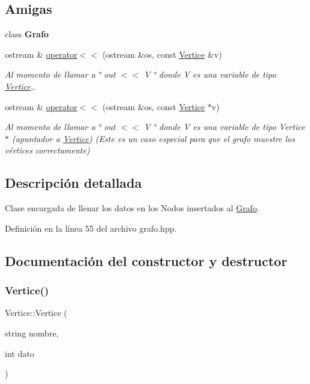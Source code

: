 \subsection*{Amigas}
\begin{DoxyCompactItemize}
\item 
\mbox{\label{classVertice_aa89bd7919924d99b99ffa9ab271175a3}} 
class {\bfseries Grafo}
\item 
ostream \& \hyperlink{classVertice_a3c70523eb9e12f80bb42762ac4708819}{operator$<$$<$} (ostream \&os, const \hyperlink{classVertice}{Vertice} \&v)
\begin{DoxyCompactList}\small\item\em Al momento de llamar a \char`\"{} out $<$$<$ V \char`\"{} donde V es una variable de tipo \hyperlink{classVertice}{Vertice},. \end{DoxyCompactList}\item 
ostream \& \hyperlink{classVertice_a11dd2c98c0d8abf3a52c680bc64ccc87}{operator$<$$<$} (ostream \&os, const \hyperlink{classVertice}{Vertice} $\ast$v)
\begin{DoxyCompactList}\small\item\em Al momento de llamar a \char`\"{} out $<$$<$ V \char`\"{} donde V es una variable de tipo Vertice$\ast$ (apuntador a \hyperlink{classVertice}{Vertice}) (Este es un caso especial para que el grafo muestre los vértices correctamente) \end{DoxyCompactList}\end{DoxyCompactItemize}


\subsection{Descripción detallada}
Clase encargada de llenar los datos en los Nodos insertados al \hyperlink{classGrafo}{Grafo}. 

Definición en la línea 55 del archivo grafo.\+hpp.



\subsection{Documentación del constructor y destructor}
\mbox{\label{classVertice_a7aff8f5bebd64a371708d72e12edc1dd}} 
\subsubsection{\texorpdfstring{Vertice()}{Vertice()}}
{\footnotesize\ttfamily Vertice\+::\+Vertice (\begin{DoxyParamCaption}\item[{string}]{nombre,  }\item[{int}]{dato }\end{DoxyParamCaption})\hspace{0.3cm}{\ttfamily [inline]}}



